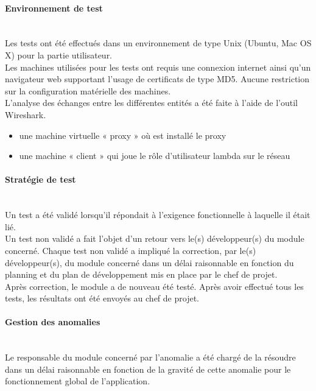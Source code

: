 \paragraph{Environnement de test}~~\\

Les tests ont été effectués dans un environnement de type Unix (Ubuntu, Mac OS 
X) pour la partie utilisateur.~~\\

Les machines utilisées pour les tests ont requis une connexion internet ainsi qu'un
navigateur web supportant l'usage de certificats de type MD5. Aucune restriction sur la configuration matérielle des machines.~~\\

L'analyse des échanges entre les différentes entités a été faite à l'aide de l'outil Wireshark.
\begin{itemize}
\item une machine virtuelle « proxy » où est installé le proxy 
\item une machine « client » qui joue le rôle d'utilisateur lambda sur le réseau
\end{itemize}

\paragraph{Stratégie de test}~~\\

Un test a été validé lorsqu’il répondait à l’exigence fonctionnelle à laquelle il était lié.~~\\

Un test non validé a fait l’objet d’un retour vers le(s) développeur(s) du module concerné.
Chaque test non validé a impliqué la correction, par le(s) développeur(s), du module concerné dans
un délai raisonnable en fonction du planning et du plan de développement mis en place par le chef de
projet.~~\\

Après correction, le module a de nouveau été testé. Après avoir effectué tous les tests, les
résultats ont été envoyés au chef de projet.

\paragraph{Gestion des anomalies}~~\\

Le responsable du module concerné par l’anomalie a été chargé de la résoudre dans un délai raisonnable en fonction de la gravité de cette anomalie pour le fonctionnement global
  de l’application. ~~\\
    
